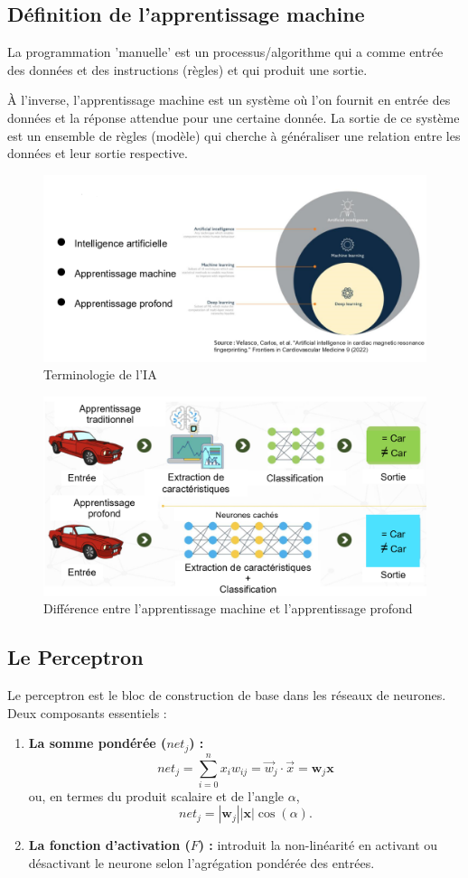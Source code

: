 \documentclass{article}
\begin{document}
\subsection{Définition de l’apprentissage machine}
La programmation 'manuelle' est un processus/algorithme qui a comme entrée des données et des instructions (règles) et qui produit une sortie.

À l'inverse, l'apprentissage machine est un système où l'on fournit en entrée des données et la réponse attendue pour une certaine donnée. La sortie de ce système est un ensemble de règles (modèle) qui cherche à généraliser une relation entre les données et leur sortie respective.

\begin{figure}[ht]
    \centering
    \includegraphics[width=0.5\linewidth]{graphics/S2Intro/AITerms.PNG}
    \caption{Terminologie de l'IA}
    \label{fig:ai-terms}
\end{figure}

\begin{figure}[ht]
    \centering
    \includegraphics[width=0.7\linewidth]{graphics/S2Intro/ml_vs_dl.PNG}
    \caption{Différence entre l'apprentissage machine et l'apprentissage profond}
    \label{fig:ai-terms-dl}
\end{figure}

\subsection{Le Perceptron}
Le perceptron est le bloc de construction de base dans les réseaux de neurones. Deux composants essentiels :
\begin{enumerate}
    \item \textbf{La somme pondérée (\(net_j\)) :}
    \[
    net_j = \sum_{i=0}^{n} x_i w_{ij} = \vec{w}_j \cdot \vec{x} = \mathbf{w}_j \mathbf{x}
    \]
    ou, en termes du produit scalaire et de l’angle \(\alpha\),
    \[
    net_j = |\mathbf{w}_j| |\mathbf{x}| \cos(\alpha).
    \]
    
    \item \textbf{La fonction d'activation (\(F\)) :} introduit la non-linéarité en activant ou désactivant le neurone selon l’agrégation pondérée des entrées.
\end{enumerate}
\end{document}
